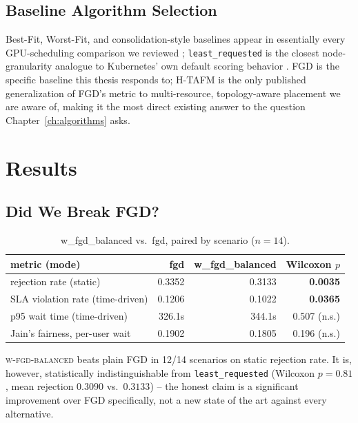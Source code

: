 \documentclass[12pt]{report}
\begin{document}
\section{Baseline Algorithm Selection}
Best-Fit, Worst-Fit, and consolidation-style baselines appear in
essentially every GPU-scheduling comparison we reviewed
\citep{fgd2023,pwr2024}; \texttt{least\_requested} is the closest
node-granularity analogue to Kubernetes' own default scoring behavior
\citep{borg2016}. FGD is the specific baseline this thesis responds to;
H-TAFM is the only published generalization of FGD's metric to
multi-resource, topology-aware placement we are aware of, making it the
most direct existing answer to the question Chapter~\ref{ch:algorithms}
asks.

\chapter{Results}
\label{ch:results}

\section{Did We Break FGD?}
\begin{table}[h]
\centering
\caption{w\_fgd\_balanced vs.\ fgd, paired by scenario ($n=14$).}
\label{tab:th-break-fgd}
\small
\begin{tabular}{lrrr}
\toprule
metric (mode) & fgd & w\_fgd\_balanced & Wilcoxon $p$ \\
\midrule
rejection rate (static) & 0.3352 & 0.3133 & \textbf{0.0035} \\
SLA violation rate (time-driven) & 0.1206 & 0.1022 & \textbf{0.0365} \\
p95 wait time (time-driven) & 326.1s & 344.1s & 0.507 (n.s.) \\
Jain's fairness, per-user wait & 0.1902 & 0.1805 & 0.196 (n.s.) \\
\bottomrule
\end{tabular}
\end{table}
\textsc{w-fgd-balanced} beats plain FGD in 12/14 scenarios on static
rejection rate. It is, however, statistically indistinguishable from
\texttt{least\_requested} (Wilcoxon $p=0.81$, mean rejection $0.3090$ vs.\
$0.3133$) -- the honest claim is a significant improvement over FGD
specifically, not a new state of the art against every alternative.
\end{document}
